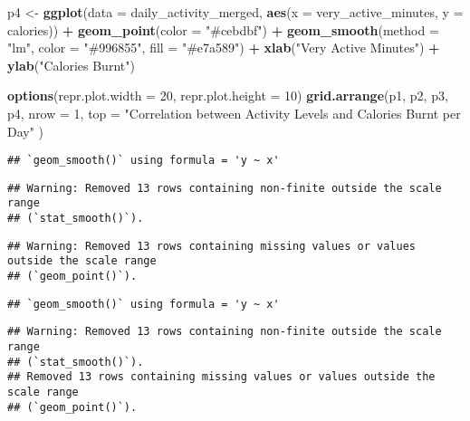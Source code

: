 \documentclass[
]{article}
\newenvironment{Shaded}{\begin{snugshade}}{\end{snugshade}}
\newcommand{\AttributeTok}[1]{\textcolor[rgb]{0.13,0.29,0.53}{#1}}
\newcommand{\DecValTok}[1]{\textcolor[rgb]{0.00,0.00,0.81}{#1}}
\newcommand{\FunctionTok}[1]{\textcolor[rgb]{0.13,0.29,0.53}{\textbf{#1}}}
\newcommand{\NormalTok}[1]{#1}
\newcommand{\OtherTok}[1]{\textcolor[rgb]{0.56,0.35,0.01}{#1}}
\newcommand{\SpecialCharTok}[1]{\textcolor[rgb]{0.81,0.36,0.00}{\textbf{#1}}}
\newcommand{\StringTok}[1]{\textcolor[rgb]{0.31,0.60,0.02}{#1}}
\begin{document}
\begin{Shaded}
\begin{Highlighting}[]
\NormalTok{p4 }\OtherTok{\textless{}{-}} \FunctionTok{ggplot}\NormalTok{(}\AttributeTok{data =}\NormalTok{ daily\_activity\_merged, }\FunctionTok{aes}\NormalTok{(}\AttributeTok{x =}\NormalTok{ very\_active\_minutes, }\AttributeTok{y =}\NormalTok{ calories)) }\SpecialCharTok{+} \FunctionTok{geom\_point}\NormalTok{(}\AttributeTok{color =} \StringTok{"\#cebdbf"}\NormalTok{) }\SpecialCharTok{+} \FunctionTok{geom\_smooth}\NormalTok{(}\AttributeTok{method =} \StringTok{"lm"}\NormalTok{, }\AttributeTok{color =} \StringTok{"\#996855"}\NormalTok{, }\AttributeTok{fill =} \StringTok{"\#e7a589"}\NormalTok{) }\SpecialCharTok{+} \FunctionTok{xlab}\NormalTok{(}\StringTok{"Very Active Minutes"}\NormalTok{) }\SpecialCharTok{+} \FunctionTok{ylab}\NormalTok{(}\StringTok{"Calories Burnt"}\NormalTok{)}

\FunctionTok{options}\NormalTok{(}\AttributeTok{repr.plot.width =} \DecValTok{20}\NormalTok{, }\AttributeTok{repr.plot.height =} \DecValTok{10}\NormalTok{)}
\FunctionTok{grid.arrange}\NormalTok{(p1, p2, p3, p4,}
            \AttributeTok{nrow =} \DecValTok{1}\NormalTok{,}
            \AttributeTok{top =} \StringTok{"Correlation between Activity Levels and Calories Burnt per Day"}
\NormalTok{)}
\end{Highlighting}
\end{Shaded}

\begin{verbatim}
## `geom_smooth()` using formula = 'y ~ x'
\end{verbatim}

\begin{verbatim}
## Warning: Removed 13 rows containing non-finite outside the scale range
## (`stat_smooth()`).
\end{verbatim}

\begin{verbatim}
## Warning: Removed 13 rows containing missing values or values outside the scale range
## (`geom_point()`).
\end{verbatim}

\begin{verbatim}
## `geom_smooth()` using formula = 'y ~ x'
\end{verbatim}

\begin{verbatim}
## Warning: Removed 13 rows containing non-finite outside the scale range
## (`stat_smooth()`).
## Removed 13 rows containing missing values or values outside the scale range
## (`geom_point()`).
\end{verbatim}
\end{document}
